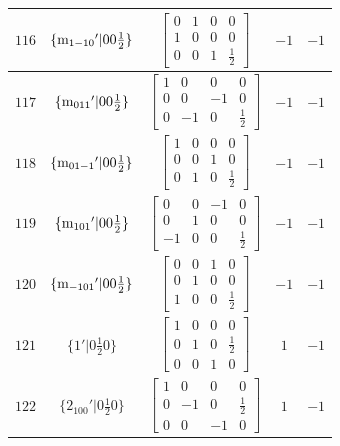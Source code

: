 \documentclass[fleqn,8pt]{jsarticle}
\begin{document}
\begin{longtable}{ccccc}
$ 116 $ & $ \{{\rm m}_{1-10}{}'|0 0 \frac{1}{2}\} $ & $ \begin{bmatrix} 0 & 1 & 0 & 0 \\ 1 & 0 & 0 & 0 \\ 0 & 0 & 1 & \frac{1}{2} \end{bmatrix} $ & $ -1 $ & $ -1 $ \\ \hline
$ 117 $ & $ \{{\rm m}_{011}{}'|0 0 \frac{1}{2}\} $ & $ \begin{bmatrix} 1 & 0 & 0 & 0 \\ 0 & 0 & -1 & 0 \\ 0 & -1 & 0 & \frac{1}{2} \end{bmatrix} $ & $ -1 $ & $ -1 $ \\ \hline
$ 118 $ & $ \{{\rm m}_{01-1}{}'|0 0 \frac{1}{2}\} $ & $ \begin{bmatrix} 1 & 0 & 0 & 0 \\ 0 & 0 & 1 & 0 \\ 0 & 1 & 0 & \frac{1}{2} \end{bmatrix} $ & $ -1 $ & $ -1 $ \\ \hline
$ 119 $ & $ \{{\rm m}_{101}{}'|0 0 \frac{1}{2}\} $ & $ \begin{bmatrix} 0 & 0 & -1 & 0 \\ 0 & 1 & 0 & 0 \\ -1 & 0 & 0 & \frac{1}{2} \end{bmatrix} $ & $ -1 $ & $ -1 $ \\ \hline
$ 120 $ & $ \{{\rm m}_{-101}{}'|0 0 \frac{1}{2}\} $ & $ \begin{bmatrix} 0 & 0 & 1 & 0 \\ 0 & 1 & 0 & 0 \\ 1 & 0 & 0 & \frac{1}{2} \end{bmatrix} $ & $ -1 $ & $ -1 $ \\ \hline
$ 121 $ & $ \{1{}'|0 \frac{1}{2} 0\} $ & $ \begin{bmatrix} 1 & 0 & 0 & 0 \\ 0 & 1 & 0 & \frac{1}{2} \\ 0 & 0 & 1 & 0 \end{bmatrix} $ & $ 1 $ & $ -1 $ \\ \hline
$ 122 $ & $ \{2{}_{100}{}'|0 \frac{1}{2} 0\} $ & $ \begin{bmatrix} 1 & 0 & 0 & 0 \\ 0 & -1 & 0 & \frac{1}{2} \\ 0 & 0 & -1 & 0 \end{bmatrix} $ & $ 1 $ & $ -1 $ \\ \hline

\end{longtable}
\end{document}
